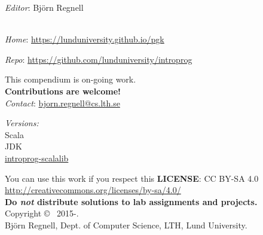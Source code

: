 
\clearpage\null\thispagestyle{empty}
\vfill

{
\setlength{\parindent}{0pt}
\emph{Editor}: Björn Regnell \\


\\ \newline

\emph{Home}: \url{https://lunduniversity.github.io/pgk} \newline

\emph{Repo}: \url{https://github.com/lunduniversity/introprog} \\ \newline

This compendium is on-going work. \\ \textbf{Contributions are welcome!} \\
\emph{Contact}: \url{bjorn.regnell@cs.lth.se}
\\ \newline


\emph{Versions:} \\
Scala \ScalaVersion \\
JDK \JDKVersion\\
\href{https://github.com/lunduniversity/introprog-scalalib/}{introprog-scalalib} \LibVersion \\ 

\vfill

You can use this work if you respect this \textbf{LICENSE}: CC BY-SA 4.0 \\
\url{http://creativecommons.org/licenses/by-sa/4.0/} \\
\textbf{Do \emph{not} distribute solutions to lab assignments and projects.}
\\ \newline
Copyright \copyright~ 2015-\CurrentYear. \\
Björn Regnell, Dept. of Computer Science, LTH, Lund University.\\
}
